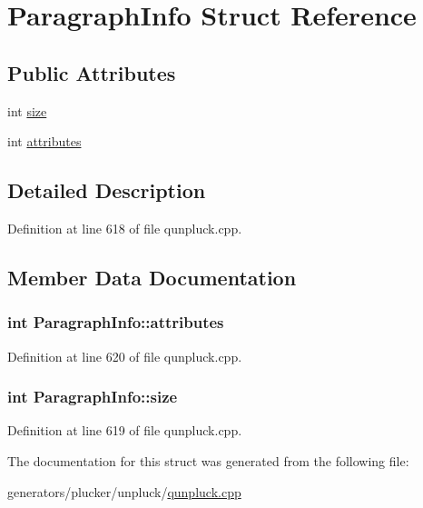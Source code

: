 \hypertarget{structParagraphInfo}{\section{Paragraph\+Info Struct Reference}
\label{structParagraphInfo}
}
\subsection*{Public Attributes}
\begin{DoxyCompactItemize}
\item 
int \hyperlink{structParagraphInfo_a7ecad945821aa59d82f0eb3d1fec1795}{size}
\item 
int \hyperlink{structParagraphInfo_acf10ce66924e1af9d1bc0e35b3ce557a}{attributes}
\end{DoxyCompactItemize}


\subsection{Detailed Description}


Definition at line 618 of file qunpluck.\+cpp.



\subsection{Member Data Documentation}
\hypertarget{structParagraphInfo_acf10ce66924e1af9d1bc0e35b3ce557a}{
\subsubsection[{attributes}]{\setlength{\rightskip}{0pt plus 5cm}int Paragraph\+Info\+::attributes}}\label{structParagraphInfo_acf10ce66924e1af9d1bc0e35b3ce557a}


Definition at line 620 of file qunpluck.\+cpp.

\hypertarget{structParagraphInfo_a7ecad945821aa59d82f0eb3d1fec1795}{
\subsubsection[{size}]{\setlength{\rightskip}{0pt plus 5cm}int Paragraph\+Info\+::size}}\label{structParagraphInfo_a7ecad945821aa59d82f0eb3d1fec1795}


Definition at line 619 of file qunpluck.\+cpp.



The documentation for this struct was generated from the following file\+:\begin{DoxyCompactItemize}
\item 
generators/plucker/unpluck/\hyperlink{qunpluck_8cpp}{qunpluck.\+cpp}\end{DoxyCompactItemize}
